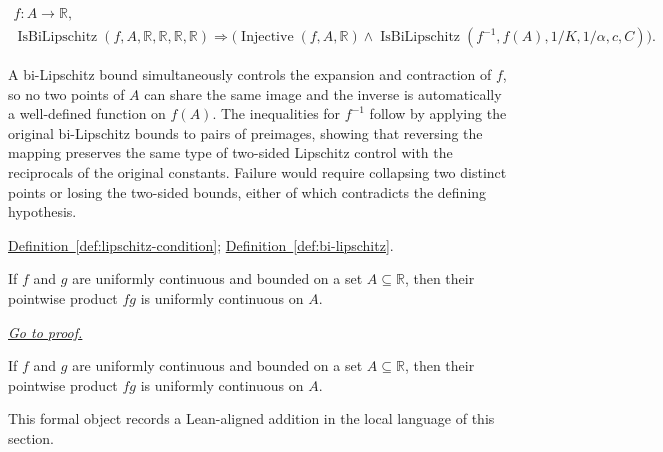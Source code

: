 \begin{remark*}
\[
\begin{aligned}
  f\colon A\to\mathbb{R},\\
\operatorname{IsBiLipschitz}(f,A,\mathbb{R},\mathbb{R},\mathbb{R},\mathbb{R})
\Rightarrow
\bigl(\operatorname{Injective}(f,A,\mathbb{R}) \land \operatorname{IsBiLipschitz}(f^{-1},f(A),1/K,1/\alpha,c,C)\bigr).
\end{aligned}
\]
\end{remark*}

\begin{remark*}[Interpretation]
A bi-Lipschitz bound simultaneously controls the expansion and contraction of $f$, so no two points of $A$ can share the same image and the inverse is automatically a well-defined function on $f(A)$. The inequalities for $f^{-1}$ follow by applying the original bi-Lipschitz bounds to pairs of preimages, showing that reversing the mapping preserves the same type of two-sided Lipschitz control with the reciprocals of the original constants. Failure would require collapsing two distinct points or losing the two-sided bounds, either of which contradicts the defining hypothesis.
\end{remark*}

\begin{dependencies}
\hyperref[def:lipschitz-condition]{Definition~\ref*{def:lipschitz-condition}}; \hyperref[def:bi-lipschitz]{Definition~\ref*{def:bi-lipschitz}}.
\end{dependencies}

\begin{theorem}
\label{thm:uc-mul-of-bounded}
If $f$ and $g$ are uniformly continuous and bounded on a set $A\subseteq\mathbb R$, then their pointwise product $fg$ is uniformly continuous on $A$.

\smallskip
\noindent
\hyperref[prf:uc-mul-of-bounded]{\textit{Go to proof.}}
\end{theorem}

\begin{remark*}
If $f$ and $g$ are uniformly continuous and bounded on a set $A\subseteq\mathbb R$, then their pointwise product $fg$ is uniformly continuous on $A$.
\end{remark*}

\begin{remark*}[Interpretation]
This formal object records a Lean-aligned addition in the local language of this section.
\end{remark*}

\begin{dependencies}
\NoLocalDependencies
\end{dependencies}
